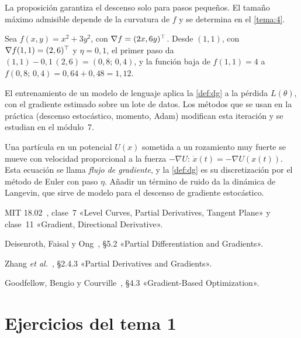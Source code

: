 La proposición garantiza el descenso solo para pasos pequeños. El tamaño máximo admisible depende de la curvatura de $f$ y se determina en el \cref{tema:4}.

\begin{ejemplo}\label{ej:dg}
Sea $f(x,y)=x^{2}+3y^{2}$, con $\nabla f=(2x,6y)^{\top}$. Desde $(1,1)$, con $\nabla f(1,1)=(2,6)^{\top}$ y $\eta=0{,}1$, el primer paso da $(1,1)-0{,}1\,(2,6)=(0{,}8;\,0{,}4)$, y la función baja de $f(1,1)=4$ a $f(0{,}8;\,0{,}4)=0{,}64+0{,}48=1{,}12$.
\end{ejemplo}

\begin{observacion}
El entrenamiento de un modelo de lenguaje aplica la \cref{def:dg} a la pérdida $L(\theta)$, con el gradiente estimado sobre un lote de datos. Los métodos que se usan en la práctica (descenso estocástico, momento, Adam) modifican esta iteración y se estudian en el módulo~7.
\end{observacion}

\begin{observacion}
Una partícula en un potencial $U(x)$ sometida a un rozamiento muy fuerte se mueve con velocidad proporcional a la fuerza $-\nabla U$: $\dot x(t)=-\nabla U(x(t))$. Esta ecuación se llama \emph{flujo de gradiente}, y la \cref{def:dg} es su discretización por el método de Euler con paso $\eta$. Añadir un término de ruido da la dinámica de Langevin, que sirve de modelo para el descenso de gradiente estocástico.
\end{observacion}

\begin{lecturas}
\item MIT 18.02~\cite{mit1802}, clase~7 «Level Curves, Partial Derivatives, Tangent Plane» y clase~11 «Gradient, Directional Derivative».
\item Deisenroth, Faisal y Ong~\cite{mml}, §5.2 «Partial Differentiation and Gradients».
\item Zhang \emph{et al.}~\cite{d2l}, §2.4.3 «Partial Derivatives and Gradients».
\item Goodfellow, Bengio y Courville~\cite{gbc}, §4.3 «Gradient-Based Optimization».
\end{lecturas}

\section*{Ejercicios del tema 1}

